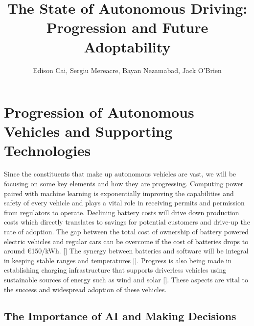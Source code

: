 \documentclass{article}
\author{Edison Cai, Sergiu Mereacre, Bayan Nezamabad, Jack O'Brien}
\title{The State of Autonomous Driving: Progression and Future Adoptability}
\begin{document}
\maketitle

\section{Progression of Autonomous Vehicles and Supporting Technologies}

Since the constituents that make up autonomous vehicles are vast, we will be focusing on some key elements and how they are progressing. Computing power paired with machine learning is exponentially improving the capabilities and safety of every vehicle and plays a vital role in receiving permits and permission from regulators to operate. Declining battery costs will drive down production costs which directly translates to savings for potential customers and drive-up the rate of adoption. The gap between the total cost of ownership of battery powered electric vehicles and regular cars can be overcome if the cost of batteries drops to around
€150/kWh. [\textcite{van2011energy}] The synergy between batteries and software will be integral in keeping stable ranges and temperatures [\textcite{ali2019towards}]. Progress is also being made in establishing charging infrastructure that supports driverless vehicles using sustainable sources of energy such as wind and solar [\textcite{nunes2015day}]. These aspects are vital to the success and widespread adoption of these vehicles.  

\subsection{The Importance of AI and Making Decisions}
\end{document}
